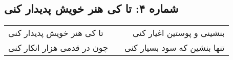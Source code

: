 \begin{center}
\section*{شماره ۴: تا کی هنر خویش پدیدار کنی}
\label{sec:004}
\begin{longtable}{l p{0.5cm} r}
تا کی هنر خویش پدیدار کنی
&&
بنشینی و پوستین اغیار کنی
\\
چون در قدمی هزار انکار کنی
&&
تنها بنشین که سود بسیار کنی
\\
\end{longtable}
\end{center}
